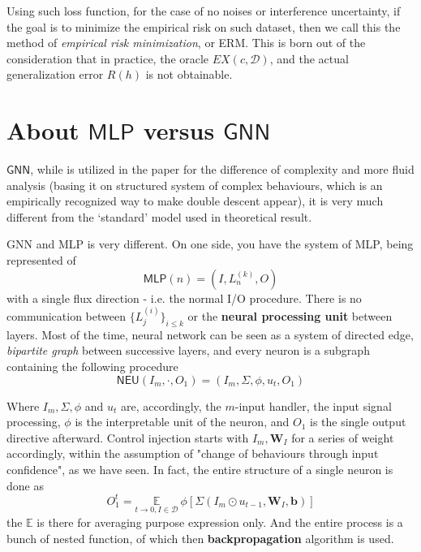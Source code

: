 \documentclass[twoside,10pt]{article}
\begin{document}
Using such loss function, for the case of no noises or interference uncertainty, if the goal is to minimize the empirical risk on such dataset, then we call this the method of \textit{empirical risk minimization}, or ERM. This is born out of the consideration that in practice, the oracle $EX(c,\mathcal{D})$, and the actual generalization error $R(h)$ is not obtainable. 

\section{About $\mathsf{MLP}$ versus $\mathsf{GNN}$}

$\mathsf{GNN}$, while is utilized in the paper for the difference of complexity and more fluid analysis (basing it on structured system of complex behaviours, which is an empirically recognized way to make double descent appear), it is very much different from the `standard' model used in theoretical result. 

GNN and MLP is very different. On one side, you have the system of MLP, being represented of $$\mathsf{MLP}(n)=(I,L^{(k)}_{n}, O)$$
with a single flux direction - i.e. the normal I/O procedure. There is no communication between $\{ L^{(i)}_{j} \}_{i\leq k}$ or the \textbf{neural processing unit} between layers. Most of the time, neural network can be seen as a system of directed edge, \textit{bipartite graph} between successive layers, and every neuron is a subgraph containing the following procedure $$\mathsf{NEU}(I_{{m}}, \cdot, O_{1})= (I_{m}, \Sigma, \phi, u_{t}, O_{1})$$

Where $I_{m}, \Sigma,\phi$ and $u_{t}$ are, accordingly, the $m$-input handler, the input signal processing, $\phi$ is the interpretable unit of the neuron, and $O_{1}$ is the single output directive afterward. Control injection starts with $I_{m},\mathbf{W}_{I}$ for a series of weight accordingly, within the assumption of "change of behaviours through input confidence", as we have seen. In fact, the entire structure of a single neuron is done as $$O_{1}^{t}=\underset{t\to 0, I\in \mathcal{D}}{\mathbb{E}}\:\phi[\Sigma(I_{m} \odot u_{t-1}, \mathbf{W}_{{I}}, \mathbf{b})]$$
the $\mathbb{E}$ is there for averaging purpose expression only. And the entire process is a bunch of nested function, of which then \textbf{backpropagation} algorithm is used. 
\end{document}
